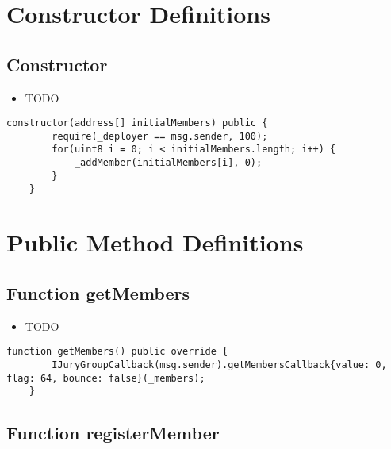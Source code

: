 \section{Constructor Definitions}


\subsection{Constructor}

\begin{itemize}
\item TODO
\end{itemize}

\begin{lstlisting}[firstnumber=17]
    constructor(address[] initialMembers) public {
        require(_deployer == msg.sender, 100);
        for(uint8 i = 0; i < initialMembers.length; i++) {
            _addMember(initialMembers[i], 0);
        }
    }
\end{lstlisting}

\section{Public Method Definitions}


\subsection{Function getMembers}

\begin{itemize}
\item TODO
\end{itemize}

\begin{lstlisting}[firstnumber=45]
    function getMembers() public override {
        IJuryGroupCallback(msg.sender).getMembersCallback{value: 0, flag: 64, bounce: false}(_members);
    }
\end{lstlisting}

\subsection{Function registerMember}

